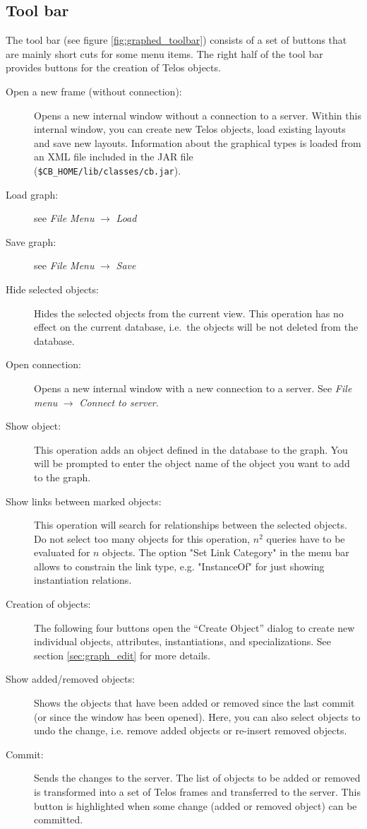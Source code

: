 

\subsection{Tool bar}

The tool bar (see figure \ref{fig:graphed_toolbar})
consists of a set of buttons that are mainly short cuts
for some menu items. The right half of the tool bar provides buttons
for the creation of Telos objects.


\begin{description}
\item[Open a new frame (without connection):] Opens a new internal window without a connection
to a server. Within this internal window, you can create new Telos objects, load existing
layouts and save new layouts. Information about the graphical types is loaded
from an XML file included in the JAR file\\ (\verb+$CB_HOME/lib/classes/cb.jar+).
\item[Load graph:] see {\em File Menu} $\rightarrow$ {\em Load}
\item[Save graph:] see {\em File Menu} $\rightarrow$ {\em Save}
\item[Hide selected objects:] Hides the selected objects from the current
view. This operation has no effect on the current database, i.e.\ the objects
will be not deleted from the database.
\item[Open connection:] Opens a new internal window with a new connection to
a server. See {\em File menu} $\rightarrow$ {\em Connect to server}.
\item[Show object:] This operation adds an object defined in the database to the graph.
You will be prompted to enter the object name of the object you want to
add to the graph.
\item[Show links between marked objects:] This operation will search for
relationships between the selected objects. Do not select too many objects
for this operation, $n^2$ queries have to be evaluated for $n$ objects.
The option "Set Link Category" in the menu bar allows to constrain the link type, e.g. "InstanceOf" for
just showing instantiation relations.
\item[Creation of objects:] The following four buttons open the ``Create Object''
dialog to create new individual objects, attributes, instantiations, and specializations.
See section \ref{sec:graph_edit} for more details.
\item[Show added/removed objects:] Shows the objects that have been added or
removed since the last commit (or since the window has been opened).
Here, you can also select objects to undo the change, i.e. remove added objects
or re-insert removed objects.
\item[Commit:] Sends the changes to the server. The list of objects to be added
or removed is transformed into a set of Telos frames and transferred to the
server. This button is highlighted when some change (added or removed object)
can be committed.
\end{description}


